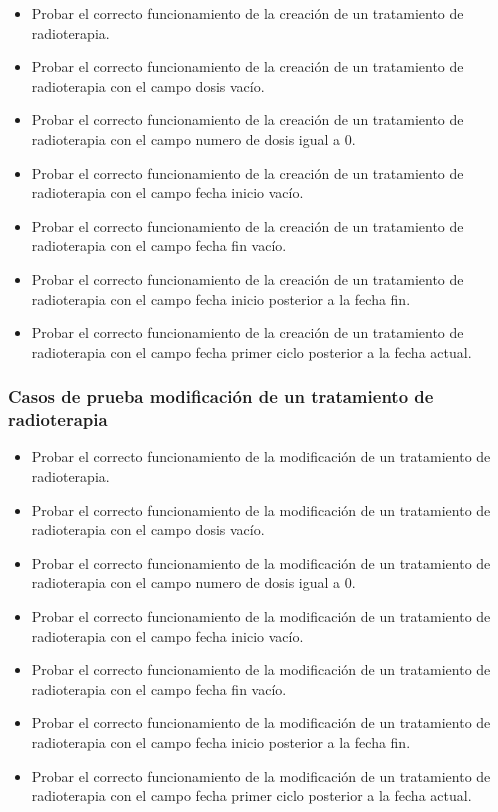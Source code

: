 \begin{itemize}
    \item Probar el correcto funcionamiento de la creación de un tratamiento de radioterapia.
    \item Probar el correcto funcionamiento de la creación de un tratamiento de radioterapia con el campo dosis vacío.
    \item Probar el correcto funcionamiento de la creación de un tratamiento de radioterapia con el campo numero de dosis igual a 0.
    \item Probar el correcto funcionamiento de la creación de un tratamiento de radioterapia con el campo fecha inicio vacío.
    \item Probar el correcto funcionamiento de la creación de un tratamiento de radioterapia con el campo fecha fin vacío.
    \item Probar el correcto funcionamiento de la creación de un tratamiento de radioterapia con el campo fecha inicio posterior a la fecha fin.
    \item Probar el correcto funcionamiento de la creación de un tratamiento de radioterapia con el campo fecha primer ciclo posterior a la fecha actual.
\end{itemize}

\subsubsection{Casos de prueba modificación de un tratamiento de radioterapia}

\begin{itemize}
    \item Probar el correcto funcionamiento de la modificación de un tratamiento de radioterapia.
    \item Probar el correcto funcionamiento de la modificación de un tratamiento de radioterapia con el campo dosis vacío.
    \item Probar el correcto funcionamiento de la modificación de un tratamiento de radioterapia con el campo numero de dosis igual a 0.
    \item Probar el correcto funcionamiento de la modificación de un tratamiento de radioterapia con el campo fecha inicio vacío.
    \item Probar el correcto funcionamiento de la modificación de un tratamiento de radioterapia con el campo fecha fin vacío.
    \item Probar el correcto funcionamiento de la modificación de un tratamiento de radioterapia con el campo fecha inicio posterior a la fecha fin.
    \item Probar el correcto funcionamiento de la modificación de un tratamiento de radioterapia con el campo fecha primer ciclo posterior a la fecha actual.
\end{itemize}

